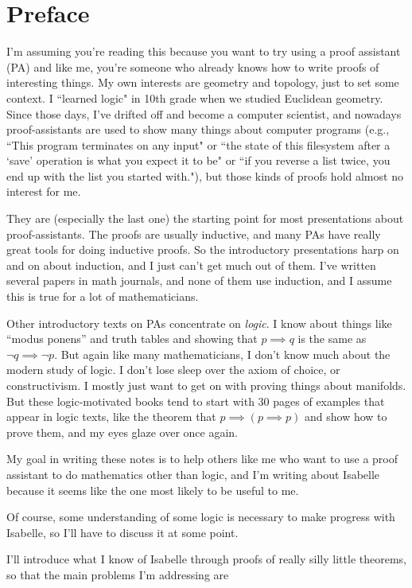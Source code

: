 \chapter* {Preface}

I'm assuming you're reading this because you want to try using a proof assistant (PA) and like me, you're someone who already knows how to write proofs of interesting things. My own interests are geometry and topology, just to set some context. I ``learned logic" in 10th grade when we studied Euclidean geometry. Since those days, I've drifted off and become a computer scientist, and nowadays proof-assistants are used to show many things about computer programs (e.g., ``This program terminates on any input" or ``the state of this filesystem after a `save' operation is what you expect it to be" or ``if you reverse a list twice, you end up with the list you started with."), but those kinds of proofs hold almost no interest for me.

They are (especially the last one) the starting point for most presentations about proof-assistants. The proofs are usually inductive, and many PAs have really great tools for doing inductive proofs. So the introductory presentations harp on and on about induction, and I just can't get much out of them. I've written several papers in math journals, and none of them use induction, and I assume this is true for a lot of mathematicians. 

Other introductory texts on PAs concentrate on \textit{logic}. I know about things like ``modus ponens'' and truth tables and showing that $p \implies q$ is the same as $\neg q \implies \neg p$. But again like many mathematicians, I don't know much about the modern study of logic. I don't lose sleep over the axiom of choice, or constructivism. I mostly just want to get on with proving things about manifolds. But these logic-motivated books tend to start with 30 pages of examples that appear in logic texts, like the theorem that $p \implies  (p \implies p)$ and show how to prove them, and my eyes glaze over once again. 

My goal in writing these notes is to help others like me who want to use a proof assistant to do mathematics other than logic, and I'm writing about Isabelle because it seems like the one most likely to be useful to me. 

Of course, some understanding of some logic is necessary to make progress with Isabelle, so I'll have to discuss it at some point. 

I'll introduce what I know of Isabelle through proofs of really silly little theorems, so that the main problems I'm addressing are 

